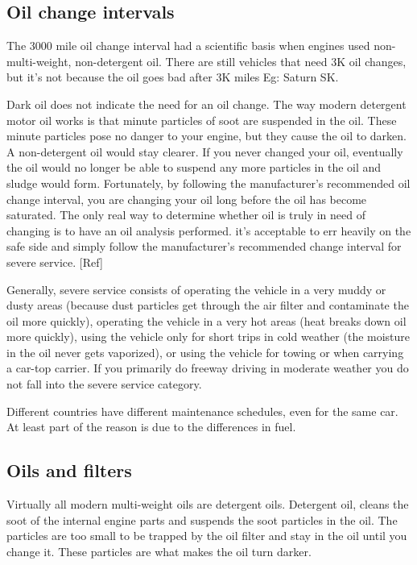 \documentclass[oneside, article]{memoir}
\begin{document}
\subsection{Oil change intervals}
The 3000 mile oil change interval had a scientific basis when engines used non-multi-weight, non-detergent oil. There are still vehicles that need 3K oil changes, but it's not because the oil goes bad after 3K miles Eg: Saturn SK.

Dark oil does not indicate the need for an oil change. The way modern detergent motor oil works is that minute particles of soot are suspended in the oil. These minute particles pose no danger to your engine, but they cause the oil to darken. A non-detergent oil would stay clearer. If you never changed your oil, eventually the oil would no longer be able to suspend any more particles in the oil and sludge would form. Fortunately, by following the manufacturer's recommended oil change interval, you are changing your oil long before the oil has become saturated. The only real way to determine whether oil is truly in need of changing is to have an oil analysis performed. it's acceptable to err heavily on the safe side and simply follow the manufacturer's recommended change interval for severe service. [Ref]

Generally, severe service consists of operating the vehicle in a very muddy or dusty areas (because dust particles get through the air filter and contaminate the oil more quickly), operating the vehicle in a very hot areas (heat breaks down oil more quickly), using the vehicle only for short trips in cold weather (the moisture in the oil never gets vaporized), or using the vehicle for towing or when carrying a car-top carrier. If you primarily do freeway driving in moderate weather you do not fall into the severe service category.

Different countries have different maintenance schedules, even for the same car. At least part of the reason is due to the differences in fuel. 

\subsection{Oils and filters}

Virtually all modern multi-weight oils are detergent oils. Detergent oil, cleans the soot of the internal engine parts and suspends the soot particles in the oil. The particles are too small to be trapped by the oil filter and stay in the oil until you change it. These particles are what makes the oil turn darker.
\end{document}
